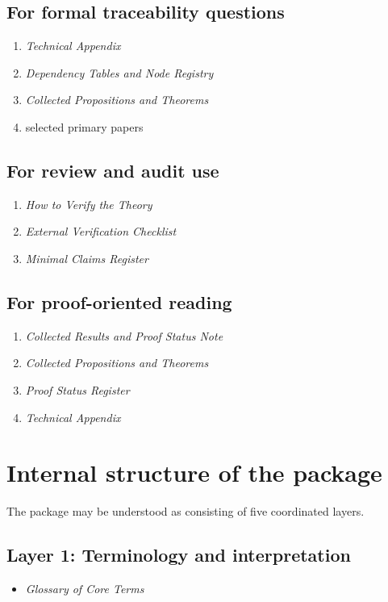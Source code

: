 \documentclass[12pt]{article}
\begin{document}
	\subsection*{For formal traceability questions}
	\begin{enumerate}[leftmargin=2em]
		\item \emph{Technical Appendix}
		\item \emph{Dependency Tables and Node Registry}
		\item \emph{Collected Propositions and Theorems}
		\item selected primary papers
	\end{enumerate}
	
	\subsection*{For review and audit use}
	\begin{enumerate}[leftmargin=2em]
		\item \emph{How to Verify the Theory}
		\item \emph{External Verification Checklist}
		\item \emph{Minimal Claims Register}
	\end{enumerate}
	
	\subsection*{For proof-oriented reading}
	\begin{enumerate}[leftmargin=2em]
		\item \emph{Collected Results and Proof Status Note}
		\item \emph{Collected Propositions and Theorems}
		\item \emph{Proof Status Register}
		\item \emph{Technical Appendix}
	\end{enumerate}
	
	\section{Internal structure of the package}
	
	The package may be understood as consisting of five coordinated layers.
	
	\subsection*{Layer 1: Terminology and interpretation}
	\begin{itemize}[leftmargin=2em]
		\item \emph{Glossary of Core Terms}
	\end{itemize}
	
\end{document}
